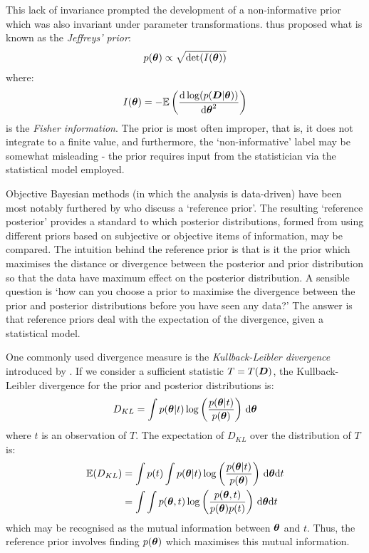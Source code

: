 This lack of invariance prompted the development of a non-informative prior which was also invariant under parameter
transformations. \cite{jeffreys1946} thus proposed what is known as the \textit{Jeffreys' prior}:
\begin{align}
p(\boldsymbol{\theta}) \propto \sqrt{\det(I(\boldsymbol{\theta}))}
\end{align}
where:
\begin{align}
I(\boldsymbol{\theta}) = -\mathbb{E} \left( \frac{\mathrm{d} \log(p(\boldsymbol{D} | \boldsymbol{\theta}))}{\mathrm{d} \boldsymbol{\theta}^2}   
\right)
\end{align}
is the \textit{Fisher information}. The prior is most often improper, that is, it does not integrate to a finite value,
and furthermore, the `non-informative' label may be somewhat misleading - the prior requires input from the statistician via
the statistical model employed.

Objective Bayesian methods (in which the analysis is data-driven) have been most notably furthered by
\cite{bernardo1979, berger1992, berger2009} who discuss a `reference prior'. The resulting `reference posterior'
provides a standard to which posterior distributions, formed from using different priors based on subjective or
objective items of information, may be compared. The intuition behind the reference prior is that is it the prior which
maximises the distance or divergence between the posterior and prior distribution so that the data have maximum effect
on the posterior distribution. A sensible question is `how can you choose a prior to maximise the divergence between the
prior and posterior distributions before you have seen any data?' The answer is that reference priors deal with the
expectation of the divergence, given a statistical model.

One commonly used divergence measure is the \textit{Kullback-Leibler divergence} introduced by \cite{kullback1951}.
If we consider a sufficient statistic \(T = T(\boldsymbol{D})\), the Kullback-Leibler divergence for the prior and posterior
distributions is:
\begin{align} 
D_{KL} = \int p(\boldsymbol{\theta} | t) \log\left(\frac{p(\boldsymbol{\theta} | t)}{p(\boldsymbol{\theta})}\right)\, \mathrm{d}\boldsymbol{\theta}
\end{align}
where \(t\) is an observation of \(T\). The expectation of \(D_{KL}\) over the distribution of \(T\) is:
\begin{align} 
\mathbb{E}(D_{KL})
&= \int p(t) \int p(\boldsymbol{\theta} | t) \log\left(\frac{p(\boldsymbol{\theta} | t)}{p(\boldsymbol{\theta})}\right)\,
\mathrm{d}\boldsymbol{\theta} \mathrm{d}t \\
&= \int \int p(\boldsymbol{\theta}, t) \log\left(\frac{p(\boldsymbol{\theta}, t)}{p(\boldsymbol{\theta}) p(t)}\right)\,
\mathrm{d}\boldsymbol{\theta} \mathrm{d}t
\end{align}
which may be recognised as the mutual information between \(\boldsymbol{\theta}\) and \(t\). Thus, the reference prior involves
finding \(p(\boldsymbol{\theta})\) which maximises this mutual information.

